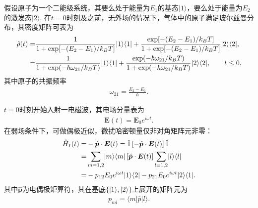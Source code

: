 \documentclass[a4paper, 10pt]{article}
\begin{document}
\begin{multicols}{2}
假设原子为一个二能级系统，其要么处于能量为$E_1$的基态$\lvert 1\rangle$，要么处于能量为$E_2$的激发态$\lvert 2\rangle$. 在$t=0$时刻及之前，无外场的情况下，气体中的原子满足玻尔兹曼分布，其密度矩阵可表为
\tiny
\begin{align}
    \label{density-matrix-init-value}
    \notag\hat{\rho}(t)=&\frac{1}{1+\exp[-(E_2-E_1)/k_BT]}\lvert 1\rangle\langle 1\rvert+\frac{\exp[-(E_2-E_1)/k_BT]}{1+\exp[-(E_2-E_1)/k_BT]}\lvert 2\rangle\langle 2\rvert,\\
    =&\frac{1}{1+\exp(-\hbar\omega_{21}/k_BT)}\lvert 1\rangle\langle 1\rvert+\frac{\exp(-\hbar\omega_{21}/k_BT)}{1+\exp(-\hbar\omega_{21}/k_BT)}\lvert 2\rangle\langle 2\rvert,\qquad t\leq 0.
\end{align}
\normalsize
其中原子的共振频率
\begin{align}
    \omega_{21}=\frac{E_2-E_1}{\hbar}.
\end{align}

$t=0$时刻开始入射一电磁波，其电场分量表为
\begin{align}
    \bm{E}(t)=\bm{E}_0e^{i\omega t}.
\end{align}
在弱场条件下，可做偶极近似，微扰哈密顿量仅非对角矩阵元非零：
\begin{align}
    \label{perturbed-Hamiltonian}
    \notag\hat{H}_I(t)=&-\hat{\bm{p}}\cdot\bm{E}(t)=\hat{1}\left[-\hat{\bm{p}}\cdot\bm{E}(t)\right]\hat{1}\\
    \notag=&\sum_{m=1,2}\lvert m\rangle\langle m\rvert\left[\hat{\bm{p}}\cdot\bm{E}(t)\right]\sum_{l=1,2}\lvert l\rangle\langle l\rvert\\
    =&-p_{12}E_0e^{i\omega t}\lvert 1\rangle\langle 2\rvert-p_{21}E_0e^{i\omega t}\lvert 2\rangle\langle 1\rvert.
\end{align}
其中$\hat{\bm{p}}$为电偶极矩算符，其在基底$\{\lvert 1\rangle,\lvert 2\rangle\}$上展开的矩阵元为
\begin{align}
    p_{ml}=\langle m\rvert\hat{p}\rvert l\rangle.
\end{align}


\end{multicols}
\end{document}
